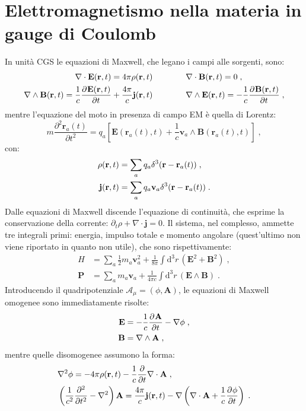 \documentclass[10pt,a4paper]{report}
\theoremstyle{definition}
\newcommand{\pdev}[3][]{\frac{\partial^{#1} #2}{\partial #3^{#1}}}
\numberwithin{equation}{section}
\newcommand{\diff}[1][]{\mathrm{d}#1}
\begin{document}
\section{Elettromagnetismo nella materia in gauge di Coulomb}
In unità CGS le equazioni di Maxwell, che legano i campi alle sorgenti, sono:
\begin{align}
\nabla\cdot\mathbf{E}(\mathbf{r},t)=4\pi\rho(\mathbf{r},t) \qquad &\qquad \nabla\cdot\mathbf{B}(\mathbf{r},t)=0\;, \notag \\
\nabla\wedge\mathbf{B}(\mathbf{r},t)=\frac{1}{c}\pdev{\mathbf{E}(\mathbf{r},t)}{t}+\frac{4\pi}{c}\mathbf{j}(\mathbf{r},t) \qquad & \qquad \nabla\wedge \mathbf{E}(\mathbf{r},t)=-\frac{1}{c}\pdev{\mathbf{B}(\mathbf{r},t)}{t}\;,
\end{align}
mentre l'equazione del moto in presenza di campo EM è quella di Lorentz:
\begin{equation}
m\pdev[2]{\mathbf{r}_a(t)}{t}=q_a\left[\mathbf{E}(\mathbf{r}_a(t),t)+\frac{1}{c}\mathbf{v}_a\wedge\mathbf{B}(\mathbf{r}_a(t),t)\right]\;,
\end{equation}
con:
\begin{align}
\rho(\mathbf{r},t)&=\sum_a q_a\delta^3(\mathbf{r}-\mathbf{r}_a(t)) \notag\;, \\
\mathbf{j}(\mathbf{r},t) &=\sum_a q_a\mathbf{v}_a\delta^3(\mathbf{r}-\mathbf{r}_a(t))\;.
\end{align}
Dalle equazioni di Maxwell discende l'equazione di continuità, che esprime la conservazione della corrente: $\partial_t\rho+\nabla\cdot\mathbf{j}=0$. Il sistema, nel complesso, ammette tre integrali primi: energia, impulso totale e momento angolare (quest'ultimo non viene riportato in quanto non utile), che sono rispettivamente:
\begin{align}
H&=\sum_a \frac{1}{2}m_a\mathbf{v}_a^2+\frac{1}{8\pi}\int\diff^3{r}\,(\mathbf{E}^2+\mathbf{B}^2) \;,\\
\mathbf{P}&= \sum_a m_a\mathbf{v}_a+\frac{1}{4\pi c}\int\diff^3{r}\,(\mathbf{E}\wedge\mathbf{B})\;.
\end{align}
Introducendo il quadripotenziale $\mathcal{A}_{\mu}=(\phi,\mathbf{A})$, le equazioni di Maxwell omogenee sono immediatamente risolte:
\begin{align}
\mathbf{E} &= -\frac{1}{c}\pdev{\mathbf{A}}{t}-\nabla\phi \notag\;, \\
\mathbf{B} &= \nabla\wedge\mathbf{A}\;,
\end{align}
mentre quelle disomogenee assumono la forma:
\begin{align}
&\nabla^2\phi = -4\pi\rho(\mathbf{r},t)-\frac{1}{c}\frac{\partial}{\partial t}\nabla\cdot\mathbf{A} \notag\;, \\
&\left(\frac{1}{c^2}\frac{\partial^2}{\partial t^2}-\nabla^2\right)\mathbf{A} = \frac{4\pi}{c}\mathbf{j}(\mathbf{r},t)-\nabla\left(\nabla\cdot\mathbf{A}+\frac{1}{c}\pdev{\phi}{t}\right)\;.
\end{align}
\end{document}
